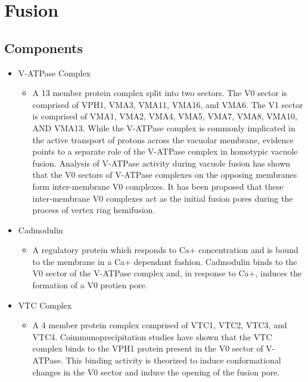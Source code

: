\documentclass[12pt,twoside]{reedthesis}
\providecommand{\tightlist}{%
  \setlength{\itemsep}{0pt}\setlength{\parskip}{0pt}}
\begin{document}
\section{Fusion}\label{fusion}

\subsection{Components}\label{components-2}

\begin{itemize}
\tightlist
\item
  V-ATPase Complex

  \begin{itemize}
  \tightlist
  \item
    A 13 member protein complex split into two sectors. The V0 sector is comprised of VPH1, VMA3, VMA11, VMA16, and VMA6. The V1 sector is comprised of VMA1, VMA2, VMA4, VMA5, VMA7, VMA8, VMA10, AND VMA13. While the V-ATPase complex is commonly implicated in the active transport of protons across the vacuolar membrane, evidence points to a separate role of the V-ATPase complex in homotypic vacuole fusion. Analysis of V-ATPase activity during vacuole fusion has shown that the V0 sectors of V-ATPase complexes on the opposing membranes form inter-membrane V0 complexes. It has been proposed that these inter-membrane V0 complexes act as the initial fusion pores during the process of vertex ring hemifusion.
  \end{itemize}
\item
  Cadmodulin

  \begin{itemize}
  \tightlist
  \item
    A regulatory protein which responds to Ca+ concentration and is bound to the membrane in a Ca+ dependant fashion. Cadmodulin binds to the V0 sector of the V-ATPase complex and, in response to Ca+, induces the formation of a V0 protien pore.
  \end{itemize}
\item
  VTC Complex

  \begin{itemize}
  \tightlist
  \item
    A 4 member protein complex comprised of VTC1, VTC2, VTC3, and VTC4. Coimmunoprecipitation studies have shown that the VTC complex binds to the VPH1 protein present in the V0 sector of V-ATPase. This binding activity is theorized to induce conformational changes in the V0 sector and induce the opening of the fusion pore.
  \end{itemize}
\end{itemize}
\end{document}
